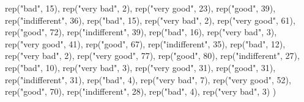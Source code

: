 \documentclass[
]{book}
\newenvironment{Shaded}{\begin{snugshade}}{\end{snugshade}}
\newcommand{\DecValTok}[1]{\textcolor[rgb]{0.00,0.00,0.81}{#1}}
\newcommand{\FunctionTok}[1]{\textcolor[rgb]{0.00,0.00,0.00}{#1}}
\newcommand{\NormalTok}[1]{#1}
\newcommand{\StringTok}[1]{\textcolor[rgb]{0.31,0.60,0.02}{#1}}
\begin{document}
\begin{Shaded}
\begin{Highlighting}[]
  \FunctionTok{rep}\NormalTok{(}\StringTok{"bad"}\NormalTok{, }\DecValTok{15}\NormalTok{), }\FunctionTok{rep}\NormalTok{(}\StringTok{"very bad"}\NormalTok{, }\DecValTok{2}\NormalTok{), }
  \FunctionTok{rep}\NormalTok{(}\StringTok{"very good"}\NormalTok{, }\DecValTok{23}\NormalTok{), }\FunctionTok{rep}\NormalTok{(}\StringTok{"good"}\NormalTok{, }\DecValTok{39}\NormalTok{), }\FunctionTok{rep}\NormalTok{(}\StringTok{"indifferent"}\NormalTok{, }\DecValTok{36}\NormalTok{), }
  \FunctionTok{rep}\NormalTok{(}\StringTok{"bad"}\NormalTok{, }\DecValTok{15}\NormalTok{), }\FunctionTok{rep}\NormalTok{(}\StringTok{"very bad"}\NormalTok{, }\DecValTok{2}\NormalTok{), }
  \FunctionTok{rep}\NormalTok{(}\StringTok{"very good"}\NormalTok{, }\DecValTok{61}\NormalTok{), }\FunctionTok{rep}\NormalTok{(}\StringTok{"good"}\NormalTok{, }\DecValTok{72}\NormalTok{), }\FunctionTok{rep}\NormalTok{(}\StringTok{"indifferent"}\NormalTok{, }\DecValTok{39}\NormalTok{), }
  \FunctionTok{rep}\NormalTok{(}\StringTok{"bad"}\NormalTok{, }\DecValTok{16}\NormalTok{), }\FunctionTok{rep}\NormalTok{(}\StringTok{"very bad"}\NormalTok{, }\DecValTok{3}\NormalTok{), }
  \FunctionTok{rep}\NormalTok{(}\StringTok{"very good"}\NormalTok{, }\DecValTok{41}\NormalTok{), }\FunctionTok{rep}\NormalTok{(}\StringTok{"good"}\NormalTok{, }\DecValTok{67}\NormalTok{), }\FunctionTok{rep}\NormalTok{(}\StringTok{"indifferent"}\NormalTok{, }\DecValTok{35}\NormalTok{), }
  \FunctionTok{rep}\NormalTok{(}\StringTok{"bad"}\NormalTok{, }\DecValTok{12}\NormalTok{), }\FunctionTok{rep}\NormalTok{(}\StringTok{"very bad"}\NormalTok{, }\DecValTok{2}\NormalTok{), }
  \FunctionTok{rep}\NormalTok{(}\StringTok{"very good"}\NormalTok{, }\DecValTok{77}\NormalTok{), }\FunctionTok{rep}\NormalTok{(}\StringTok{"good"}\NormalTok{, }\DecValTok{80}\NormalTok{), }\FunctionTok{rep}\NormalTok{(}\StringTok{"indifferent"}\NormalTok{, }\DecValTok{27}\NormalTok{), }
  \FunctionTok{rep}\NormalTok{(}\StringTok{"bad"}\NormalTok{, }\DecValTok{10}\NormalTok{), }\FunctionTok{rep}\NormalTok{(}\StringTok{"very bad"}\NormalTok{, }\DecValTok{3}\NormalTok{), }
  \FunctionTok{rep}\NormalTok{(}\StringTok{"very good"}\NormalTok{, }\DecValTok{31}\NormalTok{), }\FunctionTok{rep}\NormalTok{(}\StringTok{"good"}\NormalTok{, }\DecValTok{31}\NormalTok{), }\FunctionTok{rep}\NormalTok{(}\StringTok{"indifferent"}\NormalTok{, }\DecValTok{31}\NormalTok{), }
  \FunctionTok{rep}\NormalTok{(}\StringTok{"bad"}\NormalTok{, }\DecValTok{4}\NormalTok{), }\FunctionTok{rep}\NormalTok{(}\StringTok{"very bad"}\NormalTok{, }\DecValTok{7}\NormalTok{), }
  \FunctionTok{rep}\NormalTok{(}\StringTok{"very good"}\NormalTok{, }\DecValTok{52}\NormalTok{), }\FunctionTok{rep}\NormalTok{(}\StringTok{"good"}\NormalTok{, }\DecValTok{70}\NormalTok{), }\FunctionTok{rep}\NormalTok{(}\StringTok{"indifferent"}\NormalTok{, }\DecValTok{28}\NormalTok{), }
  \FunctionTok{rep}\NormalTok{(}\StringTok{"bad"}\NormalTok{, }\DecValTok{4}\NormalTok{), }\FunctionTok{rep}\NormalTok{(}\StringTok{"very bad"}\NormalTok{, }\DecValTok{3}\NormalTok{)}
\NormalTok{  )}


\end{Highlighting}
\end{Shaded}
\end{document}
